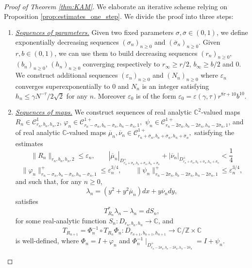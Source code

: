 \documentclass[10pt,a4paper]{amsart}
\newcommand{\C}{\mathbb{C}}
\newcommand{\Domain}[3]{D_{#1, #2, #3}}
\newcommand{\DomainP}[3]{D_{#1, #2, #3}^+}
\newcommand{\Z}{\mathbb{Z}}
\begin{document}
\begin{proof}[Proof of Theorem \ref{thm:KAM}]
We elaborate an iterative scheme relying on Proposition \ref{prop:estimates_one_step}. We divide the proof into three steps:
\begin{enumerate}
    \item {\it\underline{Sequences of parameters.}} Given two fixed parameters $\sigma,\overline\sigma\in(0,1)$, we define exponentially decreasing sequences
    $(\sigma_n)_{n\geq 0}$ and $(\overline\sigma_n)_{n\geq 0}$. Given $r,b\in(0,1)$, we can use them to build decreasing sequences
    $(r_n)_{n\geq 0}$, $(b_n)_{n\geq 0}$, $(h_n)_{n\geq 0}$ converging respectively to $r_\infty\geq r/2$, $b_\infty\geq b/2$ and $0$. 
    We construct additional sequences $(\varepsilon_n)_{n\geq 0}$ and $(N_n)_{n\geq 0}$  where $\varepsilon_n$ converges superexponentially to $0$ and $N_n$ is an integer satisfying $h_n\leq \gamma N^{-\tau}/2\sqrt 2$ for any $n$. Moreover $\varepsilon_0$ is of the form $\varepsilon_0 = \varepsilon(\gamma,\tau)r^{8\tau+10}b^{10}$.
    \item {\it\underline{Sequences of maps.}}  We construct sequences of real analytic $\C^2$-valued maps $R_n\in\mathscr C^1_{r_n,b_n,h_n,2}$, $\varphi_n\in\mathscr C^{1+}_{r_n-\sigma_n,b_n-\overline\sigma_n,h_n-\overline\sigma_n, 1},$ $\psi_n\in\mathscr C^{1+}_{r_n-2\sigma_n,b_n-2\overline\sigma_n,h_n-2\overline\sigma_n, 1}$, and of real analytic $\C$-valued maps $\overline \mu_n, \overline \nu_n \in  \mathscr C^{1+}_{r_n + \overline \sigma_n,b_n + \overline \sigma_n,h_n + \overline \sigma_n},$ satisfying the estimates
   \[  \|R_n\|_{r_n, b_n, h_n, 2} \leq \varepsilon_n, \qquad |\overline \mu_n|_{\DomainP{r_n + \overline \sigma_n}{b_n + \overline \sigma_n}{h_n + \overline \sigma_n}} + |\overline \nu_n|_{\DomainP{r_n + \overline \sigma_n}{b_n + \overline \sigma_n}{h_n + \overline \sigma_n}} < \frac{1}{4} \]
   \[\|\varphi_n\|^+_{r_n - \sigma_n, b_n - \overline \sigma_n, h_n - \overline \sigma_n, 1} \leq \varepsilon_n^{3/4},\qquad  \|\psi_n\|^+_{r_n - 2\sigma_n, b_n - 2\overline \sigma_n, h_n - 2\overline \sigma_n, 1}\leq \varepsilon_n^{3/4},\]
   and such that, for any $ n \geq 0$,
 \[ \lambda_{n} = (y^2 + y^2 \overline \mu_{n})dx + y \overline \nu_{n}dy,\]
 satisfies
    \[ 
    T_{R_{n}}^* \lambda_{n} - \lambda_{n} = d S_{n},
    \]
        for some real-analytic function $S_{n}: \Domain{r_n}{b_n}{h_n} \to \C$, and
    \[
    T_{R_{n+1}} = \Phi_n^{-1}\circ T_{R_n}\Phi_n : \Domain{r_{n + 1}}{b_{n + 1}}{h_{n + 1}}  \to \C/\Z \times \C
    \]
    is well-defined, where $\Phi_n = I+\varphi_n$ and $\Phi_n^{-1}\mid_{\DomainP{r_n-2\sigma_n}{b_n-2\overline\sigma_n}{h_n-2\overline\sigma_n}} = I+\psi_n$.    
    

\end{enumerate}
\end{proof}
\end{document}
